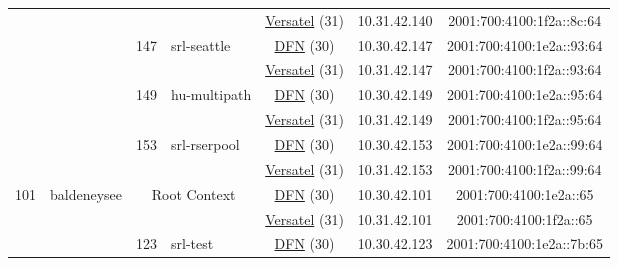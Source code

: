 \begin{small}
\begin{center}
\begin{longtable}{|c|c|c|c|c|c|c|c|}
  &  &  &  & \multicolumn{2}{|c|}{\tiny{\href{http://www.versatel.de}{Versatel} (31)}} & \tiny{10.31.42.140} & \tiny{2001:700:4100:1f2a::8c:64} \\* \cline{3-3}\cline{4-4}\cline{5-5}\cline{6-6}\cline{7-7}\cline{8-8}
  &  & \multirow{2}{*}{\tiny{147}} & \multicolumn{1}{|l|}{\multirow{2}{*}{\tiny{srl-seattle}}} & \multicolumn{2}{|c|}{\tiny{\href{https://www.dfn.de}{DFN} (30)}} & \tiny{10.30.42.147} & \tiny{2001:700:4100:1e2a::93:64} \\* \cline{5-5}\cline{6-6}\cline{7-7}\cline{8-8}
  &  &  &  & \multicolumn{2}{|c|}{\tiny{\href{http://www.versatel.de}{Versatel} (31)}} & \tiny{10.31.42.147} & \tiny{2001:700:4100:1f2a::93:64} \\* \cline{3-3}\cline{4-4}\cline{5-5}\cline{6-6}\cline{7-7}\cline{8-8}
  &  & \multirow{2}{*}{\tiny{149}} & \multicolumn{1}{|l|}{\multirow{2}{*}{\tiny{hu-multipath}}} & \multicolumn{2}{|c|}{\tiny{\href{https://www.dfn.de}{DFN} (30)}} & \tiny{10.30.42.149} & \tiny{2001:700:4100:1e2a::95:64} \\* \cline{5-5}\cline{6-6}\cline{7-7}\cline{8-8}
  &  &  &  & \multicolumn{2}{|c|}{\tiny{\href{http://www.versatel.de}{Versatel} (31)}} & \tiny{10.31.42.149} & \tiny{2001:700:4100:1f2a::95:64} \\* \cline{3-3}\cline{4-4}\cline{5-5}\cline{6-6}\cline{7-7}\cline{8-8}
  &  & \multirow{2}{*}{\tiny{153}} & \multicolumn{1}{|l|}{\multirow{2}{*}{\tiny{srl-rserpool}}} & \multicolumn{2}{|c|}{\tiny{\href{https://www.dfn.de}{DFN} (30)}} & \tiny{10.30.42.153} & \tiny{2001:700:4100:1e2a::99:64} \\* \cline{5-5}\cline{6-6}\cline{7-7}\cline{8-8}
  &  &  &  & \multicolumn{2}{|c|}{\tiny{\href{http://www.versatel.de}{Versatel} (31)}} & \tiny{10.31.42.153} & \tiny{2001:700:4100:1f2a::99:64} \\ \hline
 \multirow{20}{*}{\tiny{101}} & \multicolumn{1}{|l|}{\multirow{20}{*}{\tiny{baldeneysee}}} & \multicolumn{2}{|c|}{\multirow{2}{*}{\tiny{Root Context}}} & \multicolumn{2}{|c|}{\tiny{\href{https://www.dfn.de}{DFN} (30)}} & \tiny{10.30.42.101} & \tiny{2001:700:4100:1e2a::65} \\* \cline{5-5}\cline{6-6}\cline{7-7}\cline{8-8}
  &  & \multicolumn{2}{|c|}{} & \multicolumn{2}{|c|}{\tiny{\href{http://www.versatel.de}{Versatel} (31)}} & \tiny{10.31.42.101} & \tiny{2001:700:4100:1f2a::65} \\* \cline{3-3}\cline{4-4}\cline{5-5}\cline{6-6}\cline{7-7}\cline{8-8}
  &  & \multirow{2}{*}{\tiny{123}} & \multicolumn{1}{|l|}{\multirow{2}{*}{\tiny{srl-test}}} & \multicolumn{2}{|c|}{\tiny{\href{https://www.dfn.de}{DFN} (30)}} & \tiny{10.30.42.123} & \tiny{2001:700:4100:1e2a::7b:65} \\* \cline{5-5}\cline{6-6}\cline{7-7}\cline{8-8}

\end{longtable}
\end{center}
\end{small}
